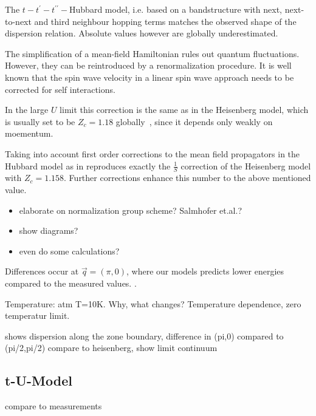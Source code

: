 \documentclass[a4paper,10pt]{report}
\begin{document}
The $t-t^{\prime}-t^{\prime \prime}-$Hubbard model, 
i.e. based on a bandstructure with next, next-to-next and third neighbour hopping terms 
matches the observed shape of the dispersion relation. 
Absolute values however are globally underestimated.

The simplification of a mean-field Hamiltonian rules out quantum fluctuations.
However, they can be reintroduced by a renormalization procedure.
It is well known 
that the spin wave velocity in a linear spin wave approach needs to be corrected for self interactions.

In the large $U$ limit this correction is the same as in the Heisenberg model, which is usually set to be $Z_c=1.18$ globally~\cite{PhysRevLett.86.5377}, 
since it depends only weakly on moementum.

Taking into account first order corrections to the mean field propagators  in the Hubbard model as in \cite{PhysRevB.43.3617} 
reproduces exactly the $\frac1S$ correction of the Heisenberg model with $Z_c=1.158$.
Further corrections enhance this number to the above mentioned value.

\begin{itemize}
\item elaborate on normalization group scheme? Salmhofer et.al.\cite{RevModPhys.84.299}?
\item show diagrams?
\item even do some calculations?
\end{itemize}







Differences occur at $\vec q = (\pi,0)$, where our models predicts lower energies compared to the measured values.
.





Temperature: atm T=10K. Why, what changes? Temperature dependence, zero temperatur limit.



shows dispersion along the zone boundary,
difference in (pi,0) compared to (pi/2,pi/2)
compare to heisenberg, show limit
continuum


\subsection{t-U-Model}
compare to measurements
\end{document}
